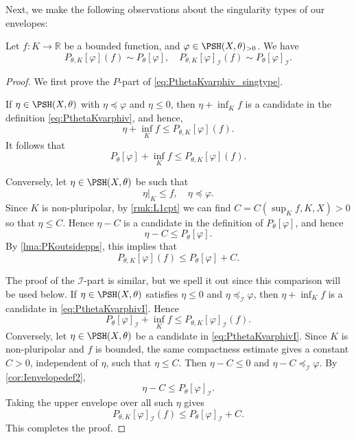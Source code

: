 Next, we make the following observations about the singularity types of our envelopes:
\begin{lemma}\label{lma:same_sing_type} Let $f \colon K\rightarrow \mathbb{R}$ be a bounded function, and $\varphi\in \PSH(X,\theta)_{>0}$. We have
\begin{equation}\label{eq:PthetaKvarphiv_singtype}
P_{\theta,K}[\varphi](f)\sim P_{\theta}[\varphi],\quad P_{\theta,K}[\varphi]_{\mathcal{I}}(f)\sim P_{\theta}[\varphi]_{\mathcal{I}}.
\end{equation}
\end{lemma}
\begin{proof}
    We first prove the $P$-part of \eqref{eq:PthetaKvarphiv_singtype}.

    If $\eta\in \PSH(X,\theta)$ with $\eta\preceq \varphi$ and $\eta\leq 0$, then $\eta+\inf_K f$ is a candidate in the definition \eqref{eq:PthetaKvarphiv}, and hence,
    \[
    \eta +\inf_K f \leq P_{\theta,K}[\varphi](f).
    \]
    It follows that
    \[
        P_{\theta}[\varphi]+\inf_K f \leq P_{\theta,K}[\varphi](f).
    \]

    Conversely, let $\eta\in \PSH(X,\theta)$ be such that
    \[
        \eta|_K\leq f,\quad \eta\preceq \varphi.
    \]
    Since $K$ is non-pluripolar, by \cref{rmk:L1cpt} we can find $C=C(\sup_K f,K, X)>0$ so that $\eta\leq C$. Hence $\eta-C$ is a candidate in the definition of $P_{\theta}[\varphi]$, and hence
    \[
        \eta-C\leq P_{\theta}[\varphi].
    \]
    By \cref{lma:PKoutsidepps}, this implies that
    \[
        P_{\theta,K}[\varphi](f) \leq P_{\theta}[\varphi] + C.
    \]

    The proof of the $\mathcal{I}$-part is similar, but we spell it out since this comparison will be used below. If $\eta\in \PSH(X,\theta)$ satisfies $\eta\leq 0$ and $\eta\preceq_{\mathcal{I}}\varphi$, then $\eta+\inf_K f$ is a candidate in \eqref{eq:PthetaKvarphivI}. Hence
    \[
        P_{\theta}[\varphi]_{\mathcal{I}}+\inf_K f\leq P_{\theta,K}[\varphi]_{\mathcal{I}}(f).
    \]
    Conversely, let $\eta\in \PSH(X,\theta)$ be a candidate in \eqref{eq:PthetaKvarphivI}. Since $K$ is non-pluripolar and $f$ is bounded, the same compactness estimate gives a constant $C>0$, independent of $\eta$, such that $\eta\leq C$. Then $\eta-C\leq 0$ and $\eta-C\preceq_{\mathcal{I}}\varphi$. By \cref{cor:Ienvelopedef2},
    \[
        \eta-C\leq P_{\theta}[\varphi]_{\mathcal{I}}.
    \]
    Taking the upper envelope over all such $\eta$ gives
    \[
        P_{\theta,K}[\varphi]_{\mathcal{I}}(f)\leq P_{\theta}[\varphi]_{\mathcal{I}}+C.
    \]
    This completes the proof.
\end{proof}

